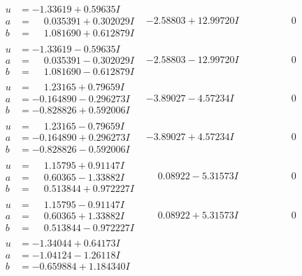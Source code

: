 \documentclass[1p]{elsarticle_modified}
\theoremstyle{definition}
\begin{document}
$$\begin{array}{c|c|c}
\begin{aligned}
u &= -1.33619 + 0.59635 I \\
a &= \phantom{-}0.035391 + 0.302029 I \\
b &= \phantom{-}1.081690 + 0.612879 I\end{aligned}
 & -2.58803 + 12.99720 I & \phantom{-0.000000 } 0 \\ \hline\begin{aligned}
u &= -1.33619 - 0.59635 I \\
a &= \phantom{-}0.035391 - 0.302029 I \\
b &= \phantom{-}1.081690 - 0.612879 I\end{aligned}
 & -2.58803 - 12.99720 I & \phantom{-0.000000 } 0 \\ \hline\begin{aligned}
u &= \phantom{-}1.23165 + 0.79659 I \\
a &= -0.164890 - 0.296273 I \\
b &= -0.828826 + 0.592006 I\end{aligned}
 & -3.89027 - 4.57234 I & \phantom{-0.000000 } 0 \\ \hline\begin{aligned}
u &= \phantom{-}1.23165 - 0.79659 I \\
a &= -0.164890 + 0.296273 I \\
b &= -0.828826 - 0.592006 I\end{aligned}
 & -3.89027 + 4.57234 I & \phantom{-0.000000 } 0 \\ \hline\begin{aligned}
u &= \phantom{-}1.15795 + 0.91147 I \\
a &= \phantom{-}0.60365 - 1.33882 I \\
b &= \phantom{-}0.513844 + 0.972227 I\end{aligned}
 & \phantom{-}0.08922 - 5.31573 I & \phantom{-0.000000 } 0 \\ \hline\begin{aligned}
u &= \phantom{-}1.15795 - 0.91147 I \\
a &= \phantom{-}0.60365 + 1.33882 I \\
b &= \phantom{-}0.513844 - 0.972227 I\end{aligned}
 & \phantom{-}0.08922 + 5.31573 I & \phantom{-0.000000 } 0 \\ \hline\begin{aligned}
u &= -1.34044 + 0.64173 I \\
a &= -1.04124 - 1.26118 I \\
b &= -0.659884 + 1.184340 I\end{aligned}

\end{array}$$
\end{document}
